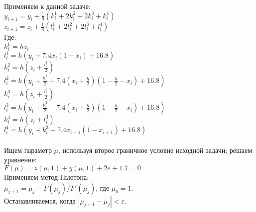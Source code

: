 \documentclass[12pt,a4paper]{article}
\begin{document}
        \noindent
        Применяем к данной задаче:\\
        $y_{i+1} = y_{i} + \frac{1}{6}(k_{i}^{1} +2k_{i}^{2} + 2k_{i}^3 + k_{i}^4)$\\
        $z_{i+1} = z_{i} + \frac{1}{6}(l_{i}^{1} +2l_{i}^{2} + 2l_{i}^3 + l_{i}^4)$\\
        Где:\\
        $k_{i}^{1} = hz_{i}$\\
        $l_{i}^{1} = h(y_{i} + 7.4x_{i}(1 - x_{i}) + 16.8)$\\
        $k_{i}^{2} = h(z_{i} + \frac{l_{i}^{1}}{2})$\\
        $l_{i}^{2} = h(y_{i} + \frac{k_{i}^{1}}{2} + 7.4(x_{i} + \frac{h}{2})
            (1 - \frac{h}{2} - x_{i}) + 16.8)$\\
        $k_{i}^{3} = h(z_{i} + \frac{l_{i}^{2}}{2})$\\
        $l_{i}^{3} = h(y_{i} + \frac{k_{i}^{2}}{2} + 7.4(x_{i} + \frac{h}{2})
            (1 - \frac{h}{2} - x_{i}) + 16.8)$\\
        $k_{i}^{4} = h(z_{i} + l_{i}^{3})$\\
        $l_{i}^{4} = h(y_{i} + k_{i}^{3} + 7.4x_{i+1}(1 - x_{i+1}) + 16.8)$\\\\
        
        \noindent
        Ищем параметр $\mu$, используя второе граничное условие исходной задачи; решаем уравнение:\\
        $F(\mu) = z(\mu, 1) + y(\mu, 1) + 2e + 1.7 = 0$\\
        Применяем метод Ньютона:\\
        $\mu_{j+1} = \mu_{j} - F(\mu_{j}) / F'(\mu_{j})$,
        где $\mu_{0} = 1$.\\
        Останавливаемся, когда $|\mu_{j+1} - \mu_{j}| < \varepsilon$.
\end{document}
